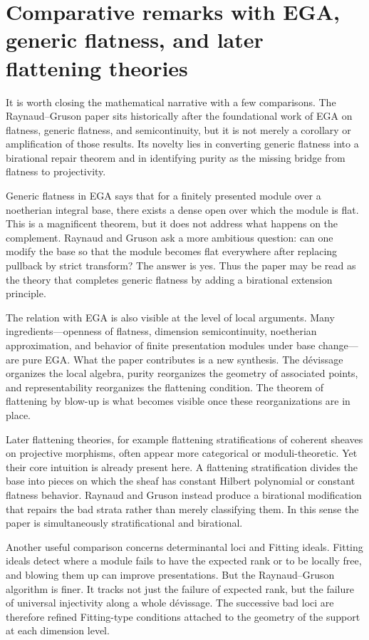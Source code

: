 \documentclass[11pt,oneside]{article}
\begin{document}
\section{Comparative remarks with EGA, generic flatness, and later flattening theories}

It is worth closing the mathematical narrative with a few comparisons.  The Raynaud--Gruson paper sits historically after the foundational work of EGA on flatness, generic flatness, and semicontinuity, but it is not merely a corollary or amplification of those results.  Its novelty lies in converting generic flatness into a birational repair theorem and in identifying purity as the missing bridge from flatness to projectivity.

Generic flatness in EGA says that for a finitely presented module over a noetherian integral base, there exists a dense open over which the module is flat.  This is a magnificent theorem, but it does not address what happens on the complement.  Raynaud and Gruson ask a more ambitious question: can one modify the base so that the module becomes flat everywhere after replacing pullback by strict transform?  The answer is yes.  Thus the paper may be read as the theory that completes generic flatness by adding a birational extension principle.

The relation with EGA is also visible at the level of local arguments.  Many ingredients---openness of flatness, dimension semicontinuity, noetherian approximation, and behavior of finite presentation modules under base change---are pure EGA.  What the paper contributes is a new synthesis.  The d\'evissage organizes the local algebra, purity reorganizes the geometry of associated points, and representability reorganizes the flattening condition.  The theorem of flattening by blow-up is what becomes visible once these reorganizations are in place.

Later flattening theories, for example flattening stratifications of coherent sheaves on projective morphisms, often appear more categorical or moduli-theoretic.  Yet their core intuition is already present here.  A flattening stratification divides the base into pieces on which the sheaf has constant Hilbert polynomial or constant flatness behavior.  Raynaud and Gruson instead produce a birational modification that repairs the bad strata rather than merely classifying them.  In this sense the paper is simultaneously stratificational and birational.

Another useful comparison concerns determinantal loci and Fitting ideals.  Fitting ideals detect where a module fails to have the expected rank or to be locally free, and blowing them up can improve presentations.  But the Raynaud--Gruson algorithm is finer.  It tracks not just the failure of expected rank, but the failure of universal injectivity along a whole d\'evissage.  The successive bad loci are therefore refined Fitting-type conditions attached to the geometry of the support at each dimension level.
\end{document}
